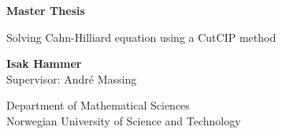\documentclass[10pt]{article}
\begin{document}
\begin{titlepage}
    \begin{center}
        \vspace*{1cm}

        \Huge
        \textbf{Master Thesis}

        \vspace{0.5cm}
        \Large
        Solving Cahn-Hilliard equation using a CutCIP method   \\

        \vspace{1.5cm}

        \textbf{Isak Hammer} \\
        \vspace{0.5cm}
        Supervisor: André Massing


        \vfill

        \vspace{0.8cm}


        \Large
        Department of Mathematical Sciences\\
        Norwegian University of Science and Technology\\

    \end{center}

\end{titlepage}

    \newpage
    \label{sec:eyyy}


    
    
    
    

    \newpage
    \printbibliography
\end{document}
